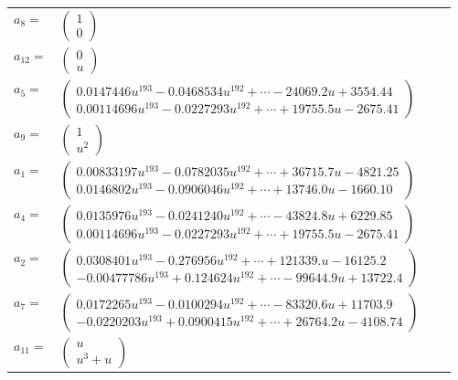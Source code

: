 \documentclass[1p]{elsarticle_modified}
\theoremstyle{definition}
\begin{document}
\begin{tabular}{m{7pt} m{180pt} m{7pt} m{180pt} }
\flushright $a_{8}=$&$\begin{pmatrix}1\\0\end{pmatrix}$ \\
\flushright $a_{12}=$&$\begin{pmatrix}0\\u\end{pmatrix}$ \\
\flushright $a_{5}=$&$\begin{pmatrix}0.0147446 u^{193}-0.0468534 u^{192}+\cdots-24069.2 u+3554.44\\0.00114696 u^{193}-0.0227293 u^{192}+\cdots+19755.5 u-2675.41\end{pmatrix}$ \\
\flushright $a_{9}=$&$\begin{pmatrix}1\\u^2\end{pmatrix}$ \\
\flushright $a_{1}=$&$\begin{pmatrix}0.00833197 u^{193}-0.0782035 u^{192}+\cdots+36715.7 u-4821.25\\0.0146802 u^{193}-0.0906046 u^{192}+\cdots+13746.0 u-1660.10\end{pmatrix}$ \\
\flushright $a_{4}=$&$\begin{pmatrix}0.0135976 u^{193}-0.0241240 u^{192}+\cdots-43824.8 u+6229.85\\0.00114696 u^{193}-0.0227293 u^{192}+\cdots+19755.5 u-2675.41\end{pmatrix}$ \\
\flushright $a_{2}=$&$\begin{pmatrix}0.0308401 u^{193}-0.276956 u^{192}+\cdots+121339. u-16125.2\\-0.00477786 u^{193}+0.124624 u^{192}+\cdots-99644.9 u+13722.4\end{pmatrix}$ \\
\flushright $a_{7}=$&$\begin{pmatrix}0.0172265 u^{193}-0.0100294 u^{192}+\cdots-83320.6 u+11703.9\\-0.0220203 u^{193}+0.0900415 u^{192}+\cdots+26764.2 u-4108.74\end{pmatrix}$ \\
\flushright $a_{11}=$&$\begin{pmatrix}u\\u^3+u\end{pmatrix}$ \\

\end{tabular}
\end{document}

